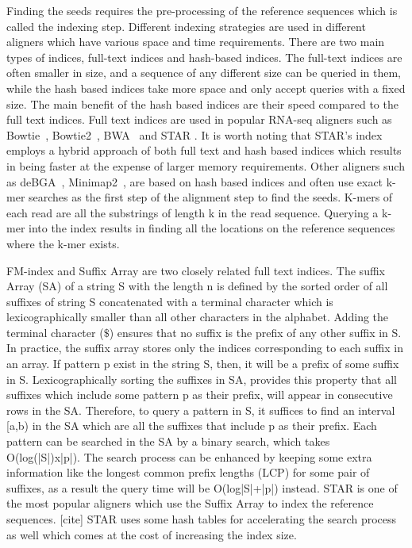 Finding the seeds requires the pre-processing of the reference sequences 
which is called the indexing step. Different indexing strategies are used 
in different aligners which have various space and time requirements. There 
are two main types of indices, full-text indices and hash-based indices. 
The full-text indices are often smaller in size, and a sequence of any different 
size can be queried in them, while the hash based indices take more space and 
only accept queries with a fixed size. The main benefit of the hash based indices 
are their speed compared to the full text indices. Full text indices are used in 
popular RNA-seq aligners such as Bowtie~\citep{bowtie}, Bowtie2~\citep{bowtie2}, 
BWA~\citep{bwamem} and STAR \citep{Dobin2013Star}. It is worth noting that STAR’s 
index employs a hybrid approach of both full text and hash based indices which 
results in being faster at the expense of larger memory requirements. 
Other aligners such as deBGA~\citep{debga}, Minimap2~\citep{minimap2}, are based 
on hash based indices and often use exact k-mer searches as the first step of 
the alignment step to find the seeds. K-mers of each read are all the substrings 
of length k in the read sequence. Querying a k-mer into the index results in 
finding all the locations on the reference sequences where the k-mer exists.

FM-index and Suffix Array are two closely related full text indices. The suffix 
Array (SA) of a string S with the length n is defined by the sorted order of all 
suffixes of string S concatenated with a terminal character which is 
lexicographically smaller than all other characters in the alphabet. 
Adding the terminal character ($\$$) ensures that no suffix is the prefix of any 
other suffix in S. In practice, the suffix array stores only the indices 
corresponding to each suffix in an array. If pattern p exist in the string S, 
then, it will be a prefix of some suffix in S. Lexicographically sorting the 
suffixes in SA, provides this property that all suffixes which include some 
pattern p as their prefix, will appear in consecutive rows in the SA. Therefore, 
to query a pattern in S, it suffices to find an interval [a,b) in the SA which 
are all the suffixes that include p as their prefix. Each pattern can be searched 
in the SA by a binary search, which takes O(log(|S|)x|p|). The search process can 
be enhanced by keeping some extra information like the longest common prefix 
lengths (LCP) for some pair of suffixes, as a result the query time will be 
O(log|S|+|p|) instead. STAR is one of the most popular aligners which use the 
Suffix Array to index the reference sequences. [cite] STAR uses some hash tables 
for accelerating the search process as well which comes at the cost of increasing 
the index size.

